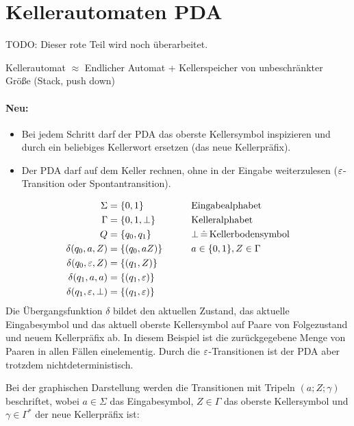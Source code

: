 \section[Kellerautomaten (\acs*{PDA})]{Kellerautomaten \quad\normalfont\normalsize \acf{PDA}}
\newcommand{\ConfRel}{\rhd}
\newcommand{\Zinit}{Z^\mathsf{init}}
\newcommand{\K}{\mathcal{K}}

{\color{red} TODO: Dieser rote Teil wird noch überarbeitet.

Kellerautomat $\approx$ Endlicher Automat + Kellerspeicher von unbeschränkter Größe (Stack, push down)
\paragraph*{Neu:}
\begin{itemize}
        \item Bei jedem Schritt darf der \ac{PDA} das oberste Kellersymbol inspizieren und durch ein beliebiges Kellerwort ersetzen (das neue Kellerpräfix).
        \item Der \ac{PDA} darf auf dem Keller rechnen, ohne in der Eingabe weiterzulesen ($\varepsilon$-Transition oder Spontantransition).
\end{itemize}
\begin{Bsp}
\label{bsp:pda-wwr}
        \begin{align}
                \Sigma &= \{0,1\} &\qquad&\text{Eingabealphabet} \notag\\
                \Gamma &= \{0,1,\bot\} &&\text{Kelleralphabet} \notag\\
                Q &= \{q_0,q_1\} &&\bot\,\hat=\,\text{Kellerbodensymbol} \notag\\
                \delta(q_0,a,Z) &= \{(q_0,aZ) \}&& a\in\{0,1\},Z\in\Gamma\\
                \delta(q_0,\varepsilon,Z) &= \{(q_1,Z)\} \label{eq:5.2}\\
                \delta(q_1,a,a) &= \{(q_1,\varepsilon)\}\\
                \delta(q_1,\varepsilon,\bot) &= \{(q_1,\varepsilon)\}
        \end{align}
  Die Übergangsfunktion $\delta$ bildet den aktuellen Zustand, das aktuelle Eingabesymbol und das aktuell oberste Kellersymbol auf Paare von Folgezustand und neuem Kellerpräfix ab.
  In diesem Beispiel ist die zurückgegebene Menge von Paaren in allen Fällen einelementig.
  Durch die $\varepsilon$-Transitionen ist der \ac{PDA} aber trotzdem nichtdeterministisch.

  Bei der graphischen Darstellung werden die Transitionen mit Tripeln $(a;Z;\gamma)$ beschriftet, wobei $a \in \Sigma$ das Eingabesymbol, $Z \in \Gamma$ das oberste Kellersymbol und $\gamma \in \Gamma^*$ der neue Kellerpräfix ist:
  \begin{center}
\end{center}
\end{Bsp}}

